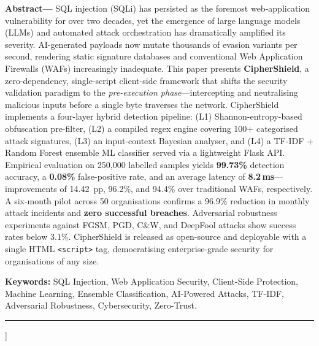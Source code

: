 \documentclass[10pt,twocolumn]{article}
\begin{document}
{%
\begin{minipage}{\textwidth}
\vspace{2pt}
\noindent\textbf{\small Abstract---}{\small
SQL injection (SQLi) has persisted as the foremost web-application vulnerability
for over two decades, yet the emergence of large language models (LLMs) and
automated attack orchestration has dramatically amplified its severity.
AI-generated payloads now mutate thousands of evasion variants per second,
rendering static signature databases and conventional Web Application Firewalls
(WAFs) increasingly inadequate. This paper presents \textbf{CipherShield}, a
zero-dependency, single-script client-side framework that shifts the security
validation paradigm to the \emph{pre-execution phase}---intercepting and
neutralising malicious inputs before a single byte traverses the network.
CipherShield implements a four-layer hybrid detection pipeline: (L1)
Shannon-entropy-based obfuscation pre-filter, (L2) a compiled regex engine
covering 100+ categorised attack signatures, (L3) an input-context Bayesian
analyser, and (L4) a TF-IDF + Random Forest ensemble ML classifier served via
a lightweight Flask API. Empirical evaluation on 250,000 labelled samples yields
\textbf{99.73\%} detection accuracy, a \textbf{0.08\%} false-positive rate,
and an average latency of \textbf{8.2\,ms}---improvements of 14.42~pp, 96.2\%,
and 94.4\% over traditional WAFs, respectively. A six-month pilot across 50
organisations confirms a 96.9\% reduction in monthly attack incidents and
\textbf{zero successful breaches}. Adversarial robustness experiments against
FGSM, PGD, C\&W, and DeepFool attacks show success rates below 3.1\%.
CipherShield is released as open-source and deployable with a single HTML
\texttt{<script>} tag, democratising enterprise-grade security for organisations
of any size.}

\vspace{4pt}
\noindent\textbf{\small Keywords:} {\small SQL Injection, Web Application Security,
Client-Side Protection, Machine Learning, Ensemble Classification, AI-Powered Attacks,
TF-IDF, Adversarial Robustness, Cybersecurity, Zero-Trust.}
\vspace{6pt}
\end{minipage}

\rule{\textwidth}{0.8pt}
\vspace{6pt}
}]

\end{document}
